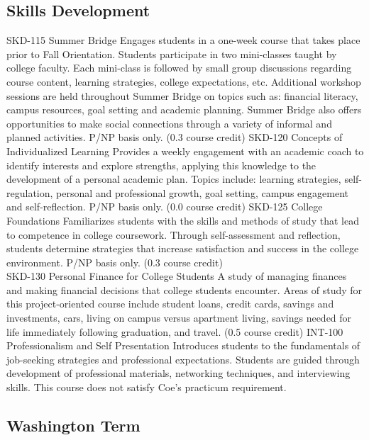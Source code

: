\documentclass[
  letterpaper,
]{scrbook}
\begin{document}
\subsection{Skills
Development}\label{sec-academic-programs-skills-development}

SKD-115 Summer Bridge Engages students in a one-week course that takes
place prior to Fall Orientation. Students participate in two
mini-classes taught by college faculty. Each mini-class is followed by
small group discussions regarding course content, learning strategies,
college expectations, etc. Additional workshop sessions are held
throughout Summer Bridge on topics such as: financial literacy, campus
resources, goal setting and academic planning. Summer Bridge also offers
opportunities to make social connections through a variety of informal
and planned activities. P/NP basis only. (0.3 course credit) SKD-120
Concepts of Individualized Learning Provides a weekly engagement with an
academic coach to identify interests and explore strengths, applying
this knowledge to the development of a personal academic plan. Topics
include: learning strategies, self-regulation, personal and professional
growth, goal setting, campus engagement and self-reflection. P/NP basis
only. (0.0 course credit) SKD-125 College Foundations Familiarizes
students with the skills and methods of study that lead to competence in
college coursework. Through self-assessment and reflection, students
determine strategies that increase satisfaction and success in the
college environment. P/NP basis only. (0.3 course credit)\\
SKD-130 Personal Finance for College Students A study of managing
finances and making financial decisions that college students encounter.
Areas of study for this project-oriented course include student loans,
credit cards, savings and investments, cars, living on campus versus
apartment living, savings needed for life immediately following
graduation, and travel. (0.5 course credit) INT-100 Professionalism and
Self Presentation Introduces students to the fundamentals of job-seeking
strategies and professional expectations. Students are guided through
development of professional materials, networking techniques, and
interviewing skills. This course does not satisfy Coe's practicum
requirement.

\subsection{Washington
Term}\label{sec-academic-programs-washington-term}
\end{document}
